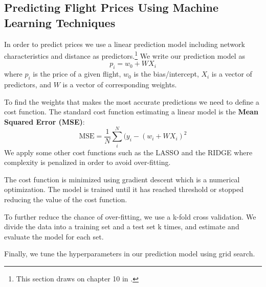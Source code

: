 \subsection{Predicting Flight Prices Using Machine Learning Techniques}
In order to predict prices we use a linear prediction model including network characteristics and distance as predictors.\footnote{This section draws on chapter 10 in \citet{raschka2015python}.} We write our prediction model as
$$
p_i = w_0 + W X_i 
$$
where $p_i$ is the price of a given flight, $w_0$ is the bias/intercept, $X_i$ is a vector of predictors, and $W$ is a vector of corresponding weights. 

To find the weights that makes the most accurate predictions we need to define a cost function. The standard cost function estimating a linear model is the \textbf{Mean Squared Error (MSE)}:
$$
\text{MSE}=\frac{1}{N} \sum_i^N (y_i - (w_i + WX_i)^2
$$
We apply some other cost functions such as the LASSO and the RIDGE where complexity is penalized in order to avoid over-fitting.

The cost function is minimized using gradient descent which is a numerical optimization. The model is trained until it has reached threshold or stopped reducing the value of the cost function.%

To further reduce the chance of over-fitting, we use a k-fold cross validation. We divide the data into a training set and a test set k times, and estimate and evaluate the model for each set. 

Finally, we tune the hyperparameters in our prediction model using grid search.